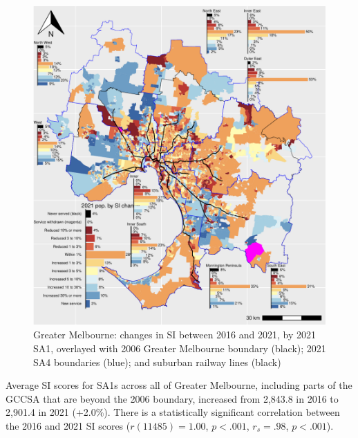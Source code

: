 \documentclass[preprint, 3p,
authoryear]{elsarticle} %
\begin{document}
\begin{figure}
\centering
\includegraphics{ReynoldsCurrieQu2024_files/figure-latex/Greater_Melbourne_2016_2021_ratio_map_plot-1.pdf}
\caption{Greater Melbourne: changes in SI between 2016 and 2021, by 2021
SA1, overlayed with 2006 Greater Melbourne boundary (black); 2021 SA4
boundaries (blue); and suburban railway lines (black)}
\end{figure}

Average SI scores for SA1s across all of Greater Melbourne, including
parts of the GCCSA that are beyond the 2006 boundary, increased from
2,843.8 in 2016 to 2,901.4 in 2021 (+2.0\%). There is a statistically
significant correlation between the 2016 and 2021 SI scores
(\(r(11485) = 1.00\), \(p < .001\), \(r_s =.98\), \(p < .001\)).
\end{document}
